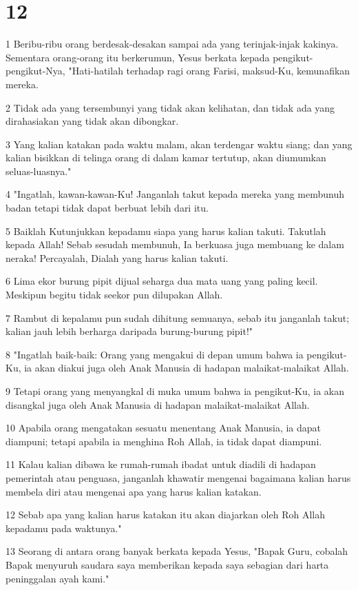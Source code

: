\chapter{12}

\par 1 Beribu-ribu orang berdesak-desakan sampai ada yang terinjak-injak kakinya. Sementara orang-orang itu berkerumun, Yesus berkata kepada pengikut-pengikut-Nya, "Hati-hatilah terhadap ragi orang Farisi, maksud-Ku, kemunafikan mereka.
\par 2 Tidak ada yang tersembunyi yang tidak akan kelihatan, dan tidak ada yang dirahasiakan yang tidak akan dibongkar.
\par 3 Yang kalian katakan pada waktu malam, akan terdengar waktu siang; dan yang kalian bisikkan di telinga orang di dalam kamar tertutup, akan diumumkan seluas-luasnya."
\par 4 "Ingatlah, kawan-kawan-Ku! Janganlah takut kepada mereka yang membunuh badan tetapi tidak dapat berbuat lebih dari itu.
\par 5 Baiklah Kutunjukkan kepadamu siapa yang harus kalian takuti. Takutlah kepada Allah! Sebab sesudah membunuh, Ia berkuasa juga membuang ke dalam neraka! Percayalah, Dialah yang harus kalian takuti.
\par 6 Lima ekor burung pipit dijual seharga dua mata uang yang paling kecil. Meskipun begitu tidak seekor pun dilupakan Allah.
\par 7 Rambut di kepalamu pun sudah dihitung semuanya, sebab itu janganlah takut; kalian jauh lebih berharga daripada burung-burung pipit!"
\par 8 "Ingatlah baik-baik: Orang yang mengakui di depan umum bahwa ia pengikut-Ku, ia akan diakui juga oleh Anak Manusia di hadapan malaikat-malaikat Allah.
\par 9 Tetapi orang yang menyangkal di muka umum bahwa ia pengikut-Ku, ia akan disangkal juga oleh Anak Manusia di hadapan malaikat-malaikat Allah.
\par 10 Apabila orang mengatakan sesuatu menentang Anak Manusia, ia dapat diampuni; tetapi apabila ia menghina Roh Allah, ia tidak dapat diampuni.
\par 11 Kalau kalian dibawa ke rumah-rumah ibadat untuk diadili di hadapan pemerintah atau penguasa, janganlah khawatir mengenai bagaimana kalian harus membela diri atau mengenai apa yang harus kalian katakan.
\par 12 Sebab apa yang kalian harus katakan itu akan diajarkan oleh Roh Allah kepadamu pada waktunya."
\par 13 Seorang di antara orang banyak berkata kepada Yesus, "Bapak Guru, cobalah Bapak menyuruh saudara saya memberikan kepada saya sebagian dari harta peninggalan ayah kami."
